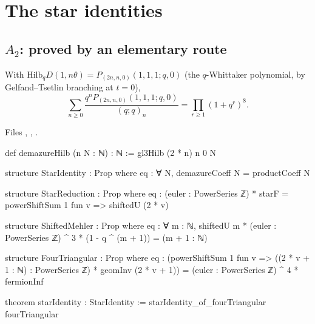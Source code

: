 \section{The star identities}\label{l25:sec:star}

\subsection{\texorpdfstring{$A_2$}{A2}: proved by an elementary route}

\begin{theorem}\label{l25:thm:a2star}
With $\mathrm{Hilb}_qD(1,n\theta)=P_{(2n,n,0)}(1,1,1;q,0)$ (the $q$-Whittaker polynomial, by Gelfand--Tsetlin
branching at $t=0$),
\begin{equation*}
\sum_{n\ge0}\frac{q^nP_{(2n,n,0)}(1,1,1;q,0)}{(q;q)_n}=\prod_{r\ge1}(1+q^r)^8 .
\end{equation*}
\end{theorem}
\noindent Files ,
, .
\begin{leancode}
def demazureHilb (n N : ℕ) : ℕ := gl3Hilb (2 * n) n 0 N

structure StarIdentity : Prop where
  eq : ∀ N, demazureCoeff N = productCoeff N

structure StarReduction : Prop where
  eq : (euler : PowerSeries ℤ) * starF = powerShiftSum 1 fun v => shiftedU (2 * v)

structure ShiftedMehler : Prop where
  eq : ∀ m : ℕ, shiftedU m * (euler : PowerSeries ℤ) ^ 3 * (1 - q ^ (m + 1)) = (m + 1 : ℕ)

structure FourTriangular : Prop where
  eq : (powerShiftSum 1 fun v => ((2 * v + 1 : ℕ) : PowerSeries ℤ) * geomInv (2 * v + 1)) =
    (euler : PowerSeries ℤ) ^ 4 * fermionInf

theorem starIdentity : StarIdentity := starIdentity_of_fourTriangular fourTriangular
\end{leancode}
